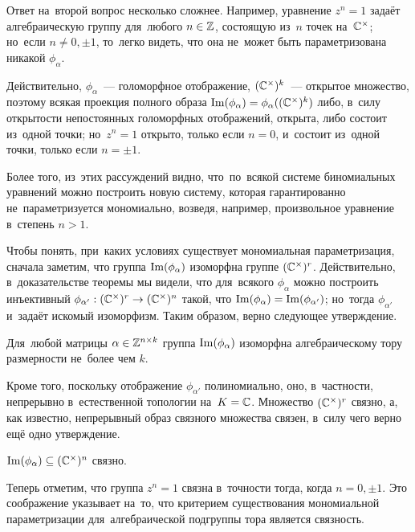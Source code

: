 \documentclass{article}
\begin{document}
Ответ на~второй вопрос несколько сложнее. Например, уравнение $z^n = 1$ задаёт алгебраическую
группу для~любого $n \in \mathbb{Z}$, состоящую из~$n$ точек на~$\mathbb{C}^\times$; но~если $n \neq 0, \pm 1$,
то~легко видеть, что она не~может быть параметризована никакой $\phi_\alpha$.

Действительно, $\phi_\alpha$~— голоморфное отображение, $(\mathbb{C}^\times)^k$~— открытое множество,
поэтому всякая проекция полного образа $\mathrm{Im}(\phi_\alpha) = \phi_\alpha((\mathbb{C}^\times)^k)$ либо, в~силу
открытости непостоянных голоморфных отображений, открыта, либо состоит из~одной точки; но~$z^n = 1$
открыто, только если $n = 0$, и~состоит из~одной точки, только если $n = \pm 1$.

Более того, из~этих рассуждений видно, что~по~всякой системе биномиальных уравнений можно построить новую систему,
которая гарантированно не~параметризуется мономиально, возведя, например, произвольное уравнение в~степень $n > 1$.

Чтобы понять, при~каких условиях существует мономиальная параметризация, сначала заметим, что группа $\mathrm{Im}(\phi_\alpha)$
изоморфна группе $(\mathbb{C}^\times)^r$. Действительно, в~доказательстве теоремы мы видели, что для~всякого $\phi_\alpha$
можно построить инъективный $\phi_{\alpha'} : (\mathbb{C}^\times)^r \rightarrow (\mathbb{C}^\times)^n$ такой, что $\mathrm{Im}(\phi_\alpha) = \mathrm{Im}(\phi_{\alpha'})$;
но~тогда $\phi_{\alpha'}$ и~задаёт искомый изоморфизм. Таким образом, верно следующее утверждение.

\begin{statement*}
    Для~любой матрицы $\alpha \in \mathbb{Z}^{n \times k}$ группа $\mathrm{Im}(\phi_\alpha)$ изоморфна алгебраическому тору размерности не~более чем $k$.
\end{statement*}

Кроме того, поскольку отображение $\phi_{\alpha'}$ полиномиально, оно, в~частности, непрерывно в~естественной топологии на~$K = \mathbb{C}$.
Множество $(\mathbb{C}^\times)^r$ связно, а, как известно, непрерывный образ связного множества связен, в~силу чего верно ещё одно утверждение.

\begin{statement*}
    $\mathrm{Im}(\phi_\alpha) \subseteq (\mathbb{C}^\times)^n$ связно.
\end{statement*}

Теперь отметим, что группа $z^n = 1$ связна в~точности тогда, когда $n = 0, \pm 1$.
Это соображение указывает на~то, что критерием существования мономиальной параметризации
для~алгебраической подгруппы тора является связность.
\end{document}
